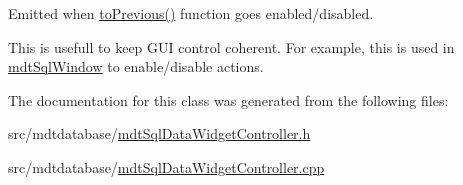 Emitted when \hyperlink{classmdt_sql_data_widget_controller_a5fd979fc55228bf7d74bf50d1bb34356}{to\-Previous()} function goes enabled/disabled. 

This is usefull to keep G\-U\-I control coherent. For example, this is used in \hyperlink{classmdt_sql_window}{mdt\-Sql\-Window} to enable/disable actions. 

The documentation for this class was generated from the following files\-:\begin{DoxyCompactItemize}
\item 
src/mdtdatabase/\hyperlink{mdt_sql_data_widget_controller_8h}{mdt\-Sql\-Data\-Widget\-Controller.\-h}\item 
src/mdtdatabase/\hyperlink{mdt_sql_data_widget_controller_8cpp}{mdt\-Sql\-Data\-Widget\-Controller.\-cpp}\end{DoxyCompactItemize}

